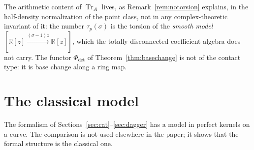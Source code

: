 \documentclass[11pt]{amsart}
\theoremstyle{definition}
\theoremstyle{remark}
\newcommand{\R}{\mathbb R}
\newcommand{\Tr}{\operatorname{Tr}}
\begin{document}
The arithmetic content of $\Tr_A$ lives, as Remark~\ref{rem:notorsion} explains,
in the half-density normalization of the point class, not in any
complex-theoretic invariant of it: the number $\tau_p(\sigma)$ is the torsion of
the \emph{smooth model} $[\R[z]\xrightarrow{(\sigma-1)z}\R[z]]$, which the
totally disconnected coefficient algebra does not carry.  The functor
$\Phi_{\det}$ of Theorem~\ref{thm:basechange} is not of the contact type: it is
base change along a ring map.

\section{The classical model}\label{sec:classical}

The formalism of Sections~\ref{sec:cat}--\ref{sec:dagger} has a model in
perfect kernels on a curve.  The comparison is not used elsewhere in the
paper; it shows that the formal structure is the classical one.
\end{document}
